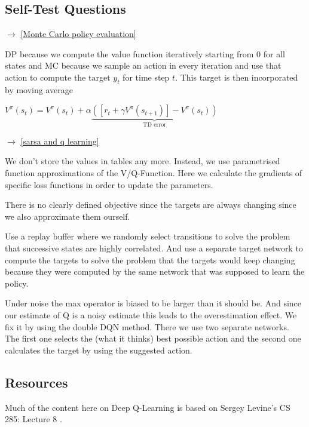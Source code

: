   \subsection{Self-Test Questions}
  \begin{enumerate}

     $\rightarrow$ \ref{Monte Carlo policy evaluation}

    \newline DP because we compute the value function iteratively starting 
    from 0 for all states and MC because we sample an action in every iteration and use 
    that action to compute the target $y_t$ for time step $t$. This target is then 
    incorporated by moving average 

    $V^{\pi}(s_t)= V^{\pi}(s_t) + \alpha 
    \underbrace{([r_t+ \gamma V^{\pi}(s_{t+1})]- V^{\pi}(s_t))}_{\text{TD error}}$

     $\rightarrow$ \ref{sarsa and q learning}

    \newline We don't store the values in tables 
    any more. Instead, we use parametrised function approximations of the V/Q-Function. 
    Here we calculate the gradients of specific loss functions in order to update the parameters. 

     \newline There is no clearly defined 
    objective since the targets are always changing since we also approximate them ourself.

    \newline
    Use a replay buffer where we randomly select transitions to solve the problem that 
    successive states are highly correlated. And use a separate target network to 
    compute the targets to solve the problem that the targets would keep changing 
    because they were computed by the same network that was supposed to learn the policy.

    \newline
    Under noise the max operator is biased to be larger than it should be. And since our 
    estimate of Q is a noisy estimate this leads to the overestimation effect. We fix it by 
    using the double DQN method. There we use two separate networks. The first one selects the 
    (what it thinks) best possible action and the second one calculates the target by using the 
    suggested action.

\end{enumerate}

\subsection{Resources}
Much of the content here on Deep Q-Learning is based on Sergey Levine’s CS 285: Lecture 8 \cite{CS285,CS285LevineYoutube}.
